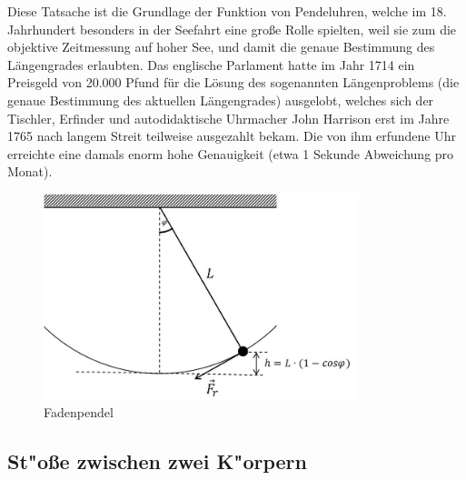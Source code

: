 Diese Tatsache ist die Grundlage der Funktion von Pendeluhren, welche im 18. Jahrhundert besonders in der Seefahrt eine große Rolle spielten, weil sie zum die objektive Zeitmessung auf hoher See, und damit die genaue Bestimmung des Längengrades erlaubten. Das englische Parlament hatte im Jahr 1714 ein Preisgeld von 20.000 Pfund für die Lösung des sogenannten Längenproblems (die genaue Bestimmung des aktuellen Längengrades) ausgelobt, welches sich der Tischler, Erfinder und autodidaktische Uhrmacher John Harrison erst im Jahre 1765 nach langem Streit teilweise ausgezahlt bekam. Die von ihm erfundene Uhr erreichte eine damals enorm hohe Genauigkeit (etwa 1 Sekunde Abweichung pro Monat).
%
\begin{figure}[hb]
	\centering
		\includegraphics[height=6cm]{Versuch_1-2/figures/Fadenpendel.jpg}
	\caption{Fadenpendel}
	\label{fig:Fadenpendel}
\end{figure}

\subsection{St"o{\ss}e zwischen zwei K"orpern}

